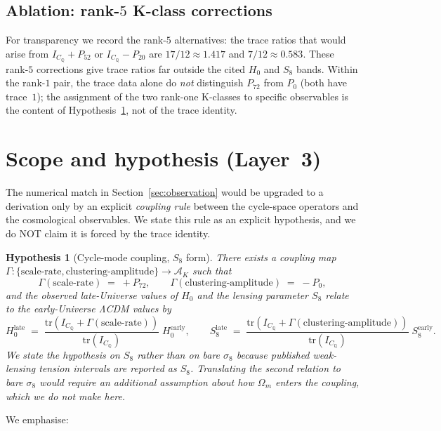 \documentclass[11pt]{article}
\newtheorem{hypothesis}{Hypothesis}[section]
\newcommand{\CQ}{C_{\mathbb{Q}}}
\newcommand{\IC}{I_{\CQ}}
\newcommand{\PK}[1]{P_{#1}}
\newcommand{\Hzero}{H_0}
\newcommand{\sigeight}{\sigma_8}
\begin{document}
\subsection{Ablation: rank-$5$ K-class corrections}

For transparency we record the rank-$5$ alternatives: the trace
ratios that would arise from $\IC + \PK{52}$ or $\IC - \PK{20}$
are $17/12 \approx 1.417$ and $7/12 \approx 0.583$. These rank-$5$
corrections give trace ratios far outside the cited $\Hzero$ and
$S_8$ bands. Within the rank-$1$ pair, the trace data alone
do \emph{not} distinguish $\PK{72}$ from $\PK{0}$ (both have
trace~$1$); the assignment of the two rank-one K-classes to specific
observables is the content of Hypothesis~\ref{hyp:coupling}, not of
the trace identity.

\section{Scope and hypothesis (Layer~3)}\label{sec:hypothesis}

The numerical match in Section~\ref{sec:observation} would be
upgraded to a derivation only by an explicit \emph{coupling rule}
between the cycle-space operators and the cosmological observables.
We state this rule as an explicit hypothesis, and we do NOT claim it
is forced by the trace identity.

\begin{hypothesis}[Cycle-mode coupling, $S_8$ form]\label{hyp:coupling}
There exists a coupling map
$\Gamma : \{\text{scale-rate}, \text{clustering-amplitude}\} \to
\mathcal{A}_K$
such that
\[
  \Gamma(\text{scale-rate}) \;=\; +\PK{72}, \qquad
  \Gamma(\text{clustering-amplitude}) \;=\; -\PK{0},
\]
and the observed late-Universe values of $\Hzero$ and the lensing
parameter $S_8$ relate to the early-Universe ΛCDM values by
\[
  \Hzero^{\mathrm{late}}
  \;=\;
  \frac{\mathrm{tr}(\IC + \Gamma(\text{scale-rate}))}{\mathrm{tr}(\IC)}
  \;\Hzero^{\mathrm{early}},
\qquad
  S_8^{\mathrm{late}}
  \;=\;
  \frac{\mathrm{tr}(\IC + \Gamma(\text{clustering-amplitude}))}{\mathrm{tr}(\IC)}
  \;S_8^{\mathrm{early}}.
\]
We state the hypothesis on $S_8$ rather than on bare $\sigeight$
because published weak-lensing tension intervals are reported as
$S_8$. Translating the second relation to bare $\sigeight$ would
require an additional assumption about how $\Omega_m$ enters the
coupling, which we do not make here.
\end{hypothesis}

We emphasise:
\end{document}
